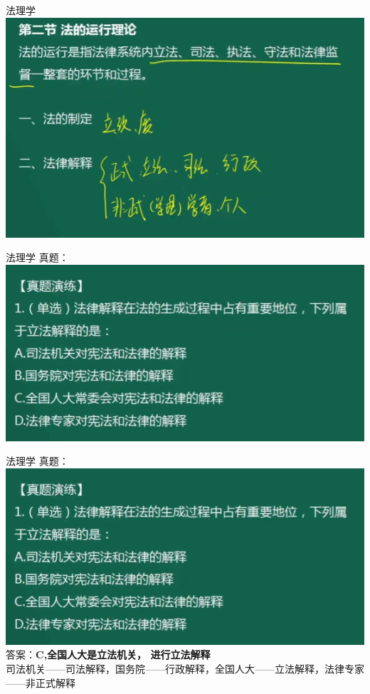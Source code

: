 \documentclass[aspectratio=169]{beamer}
\begin{document}
\begin{frame}[t]{法理学}
    \includegraphics[scale=0.5]{law-run-theory}\\ 
\end{frame}

\begin{frame}[t]{法理学}
    真题：\\
    \includegraphics[scale=0.5]{004}\\ 
\end{frame}

\begin{frame}[t]{法理学}
    真题：\\
    \includegraphics[scale=0.5]{004}\\ 
    答案：\textbf{C,全国人大是立法机关， 进行立法解释}\\
司法机关——司法解释，国务院——行政解释，全国人大——立法解释，法律专家——非正式解释\\
\end{frame}
\end{document}
